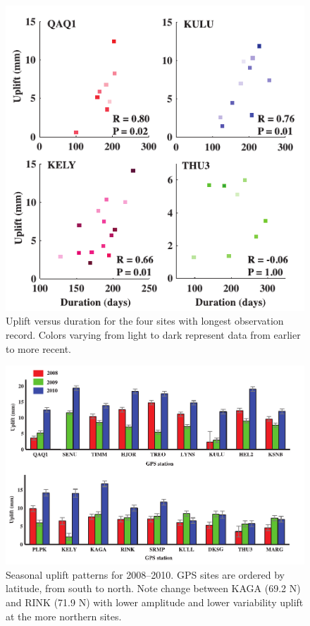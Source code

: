 \clearpage
\begin{figure}
 \centering
 \includegraphics{figs_chpt3/2012GC004432-p04.pdf} 
 \caption[Uplift versus duration for the four sites with longest observation record.]{Uplift versus duration for the four sites with longest observation record. Colors varying from light to dark represent data from earlier to more recent.}
 \label{fig:fig4}
\end{figure}

\clearpage
\begin{figure}
 \centering
 \includegraphics{figs_chpt3/2012GC004432-p05.pdf} 
 \caption[Seasonal uplift patterns for 2008–2010.]{Seasonal uplift patterns for 2008–2010. GPS sites are ordered by latitude, from south to north. Note change between KAGA (69.2 \textordmasculine N) and RINK (71.9 \textordmasculine N) with lower amplitude and lower variability uplift at the more northern sites.}
 \label{fig:fig5}
\end{figure}

